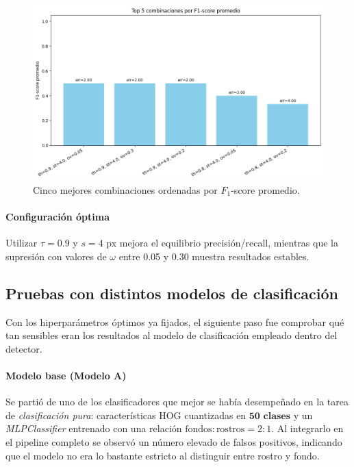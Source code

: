 \documentclass{article}
\begin{document}
\begin{figure}[H]
  \centering
  \includegraphics[width=\linewidth]{tarea_6/imagenes/top_combinations_bar.png}
  \caption{Cinco mejores combinaciones ordenadas por $F_1$-score promedio.}
  \label{fig:top5}
\end{figure}

\paragraph{Configuración óptima}
Utilizar \(\tau=0.9\) y \(s=4\) px mejora el equilibrio
precisión/recall, mientras que la supresión con valores de
\(\omega\) entre 0.05 y 0.30 muestra resultados estables.

\subsection*{Pruebas con distintos modelos de clasificación}

Con los hiperparámetros óptimos ya fijados, el siguiente paso fue comprobar qué tan sensibles eran los resultados al modelo de clasificación empleado dentro del detector.

\paragraph{Modelo base (Modelo A)}
Se partió de uno de los clasificadores que mejor se había desempeñado en la
tarea de \emph{clasificación pura}: características HOG cuantizadas en
\(\textbf{50 clases}\) y un \textit{MLPClassifier} entrenado con una relación
\(\text{fondos}:\text{rostros}=2{:}1\).
Al integrarlo en el pipeline completo se observó un número elevado de falsos
positivos, indicando que el modelo no era lo bastante estricto al distinguir
entre rostro y fondo.
\end{document}
